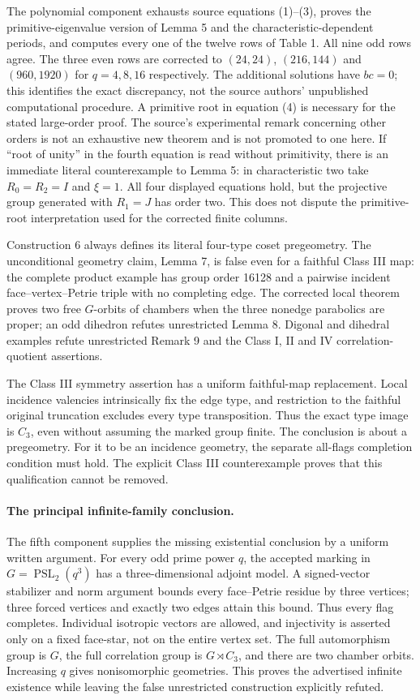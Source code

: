 \documentclass[11pt,a4paper]{article}
\begin{document}
The polynomial component exhausts source equations (1)--(3), proves the
primitive-eigenvalue version of Lemma 5 and the characteristic-dependent
periods, and computes every one of the twelve rows of Table 1. All nine
odd rows agree. The three even rows are corrected to $(24,24)$,
$(216,144)$ and $(960,1920)$ for $q=4,8,16$ respectively. The additional
solutions have $bc=0$; this identifies the exact discrepancy, not the
source authors' unpublished computational procedure. A primitive root
in equation (4) is necessary for the stated large-order proof. The
source's experimental remark concerning other orders is not an exhaustive
new theorem and is not promoted to one here.
If ``root of unity'' in the fourth equation is read without primitivity,
there is an immediate literal counterexample to Lemma 5: in characteristic
two take $R_0=R_2=I$ and $\xi=1$. All four displayed equations hold,
but the projective group generated with $R_1=J$ has order two. This
does not dispute the primitive-root interpretation used for the corrected
finite columns.

Construction 6 always defines its literal four-type coset pregeometry.
The unconditional geometry claim, Lemma 7, is false even for a faithful
Class III map: the complete product example has group order 16128 and a
pairwise incident face--vertex--Petrie triple with no completing edge.
The corrected local theorem proves two free $G$-orbits of chambers
when the three nonedge parabolics are proper; an odd dihedron refutes
unrestricted Lemma 8. Digonal and dihedral examples refute unrestricted
Remark 9 and the Class I, II and IV correlation-quotient assertions.

The Class III symmetry assertion has a uniform faithful-map replacement.
Local incidence valencies intrinsically fix the edge type, and restriction
to the faithful original truncation excludes every type transposition.
Thus the exact type image is $C_3$, even without assuming the marked
group finite. The conclusion is about a pregeometry. For it to be an
incidence geometry, the separate all-flags completion condition must
hold. The explicit Class III counterexample proves that this qualification
cannot be removed.

\paragraph{The principal infinite-family conclusion.}
The fifth component supplies the missing existential conclusion by a
uniform written argument. For every odd prime power $q$, the accepted
marking in $G=\operatorname{PSL}_2(q^3)$ has a three-dimensional adjoint
model. A signed-vector stabilizer and norm argument bounds every
face--Petrie residue by three vertices; three forced vertices and exactly
two edges attain this bound. Thus every flag completes. Individual
isotropic vectors are allowed, and injectivity is asserted only on a
fixed face-star, not on the entire vertex set. The full automorphism
group is $G$, the full correlation group is $G\rtimes C_3$, and there
are two chamber orbits. Increasing $q$ gives nonisomorphic geometries.
This proves the advertised infinite existence while leaving the false
unrestricted construction explicitly refuted.
\end{document}
